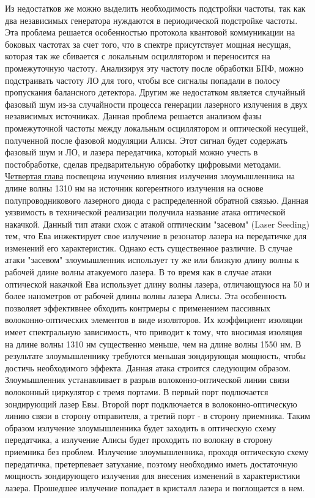 \newline Из недостатков же можно выделить необходимость подстройки частоты, так как два независимых генератора нуждаются в периодической подстройке частоты. Эта проблема решается особенностью протокола квантовой коммуникации на боковых частотах за счет того, что в спектре присутствует мощная несущая, которая так же сбивается с локальным осциллятором и переносится на промежуточную частоту. Анализируя эту частоту после обработки БПФ, можно подстраивать частоту ЛО для того, чтобы все сигналы попадали в полосу пропускания балансного детектора. Другим же недостатком является случайный фазовый шум из-за случайности процесса генерации лазерного излучения в двух независимых источниках. Данная проблема решается анализом фазы промежуточной частоты между локальным осциллятором и оптической несущей, полученной после фазовой модуляции Алисы. Этот сигнал будет содержать фазовый шум и ЛО, и лазера передатчика, который можно учесть в постобработке, сделав предварительную обработку цифровыми методами. 
\newpage \underline{Четвертая глава} посвещена изучению влияния излучения злоумышленника на длине волны 1310 нм на источник когерентного излучения на основе полупроводникового лазерного диода с распределенной обратной связью. Данная уязвимость в технической реализации получила название атака оптической накачкой. Данный тип атаки схож с атакой оптическим "засевом" (Laser Seeding) тем, что Ева инжектирует свое излучение в резонатор лазера на передатичке для изменений его характеристик. Однако есть существенное различие. В случае атаки "засевом" злоумышленник использует ту же или близкую длину волны к рабочей длине волны атакуемого лазера. В то время как в случае атаки оптической накачкой Ева использует длину волны лазера, отличающуюся на 50 и более нанометров от рабочей длины волны лазера Алисы. Эта особенность позволяет эффективнее обходить контрмеры с применением пассивных волоконно-оптических элементов в виде изоляторов. Их коэффициент изоляции имеет спектральную зависимость, что приводит к тому, что вносимая изоляция на длине волны 1310 нм существенно меньше, чем на длине волны 1550 нм. В результате злоумышленнику требуются меньшая зондирующая мощность, чтобы достичь необходимого эффекта. 
\newline Данная атака строится следующим образом. Злоумышленник устанавливает в разрыв волоконно-оптической линии связи волоконный циркулятор с тремя портами. В первый порт подлючается зондирующий лазер Евы. Второй порт подключается в волоконно-оптическую линию связи в сторону отправителя, а третий порт - в сторону приемника. Таким образом излучение злоумышленника будет заходить в оптическую схему передатчика, а излучение Алисы будет проходить по волокну в сторону приемника без проблем. Излучение злоумышленника, проходя оптическую схему передатичка, претерпевает затухание, поэтому необходимо иметь достаточную мощность зондирующего излучения для внесения изменений в характеристики лазера. Прошедшее излучение попадает в кристалл лазера и поглощается в нем.
